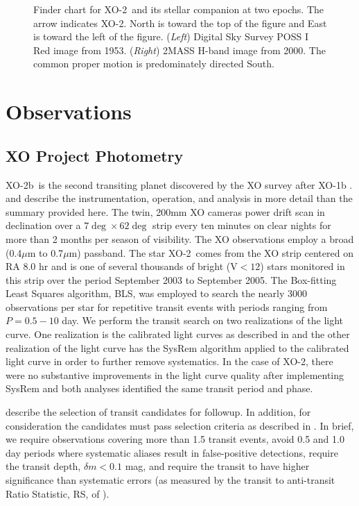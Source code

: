 \documentclass{emulateapj}
\newcommand{\xonb}{XO-2b}
\newcommand{\xon}{XO-2}
\begin{document}
\begin{figure}
\caption{Finder chart for \xon\ and its stellar companion at two epochs.  The arrow indicates \xon.  North is toward the top of the figure and East is toward the left of the figure.  ({\it Left}) Digital Sky Survey POSS I Red image
from 1953.  ({\it Right}) 2MASS H-band image from 2000.
The common proper motion is predominately directed South.\label{finder}}
\end{figure}


\section{Observations}\label{sec:obs}

\subsection{XO Project Photometry}

\xonb\ is the second transiting planet discovered by the XO survey after
XO-1b \citep{MCC06}.  \citet{MCC05} and \citet{MCC07} describe the
instrumentation, operation, and analysis in more detail than the
summary provided here.  The twin, 200mm XO cameras power drift scan in
declination over a $7\deg \times 62\deg$ strip every ten minutes on
clear nights for more than 2 months per season of visibility.  The XO
observations employ a broad (0.4$\mu$m to 0.7$\mu$m) passband.  The
star \xon\ comes from the XO strip centered on RA 8.0 hr and is one of
several thousands of bright (V$<12$) stars monitored in this strip
over the period September 2003 to September 2005.  The Box-fitting
Least Squares algorithm, BLS, \citep{KOV02} was employed to search the
nearly 3000 observations per star for repetitive transit events with
periods ranging from $P=0.5-10$ day.  We perform the transit search on
two realizations of the light curve.  One realization is the
calibrated light curves as described in \citet{MCC05} and the other
realization of the light curve has the SysRem algorithm \citep{TAM05}
applied to the calibrated light curve in order to further remove
systematics.  In the case of \xon, there were no substantive
improvements in the light curve quality after implementing SysRem and
both analyses identified the same transit period and phase.

\citet{MCC07} describe the selection of transit candidates for
followup.  In addition, for consideration the candidates must pass
selection criteria as described in \citet{BURK06}.  In brief, we
require observations covering more than 1.5 transit events, avoid 0.5
and 1.0 day periods where systematic aliases result in false-positive
detections, require the transit depth, $\delta m<0.1$ mag, and require
the transit to have higher significance than systematic errors (as
measured by the transit to anti-transit Ratio Statistic, RS, of
\citet{BURK06}).
\end{document}
